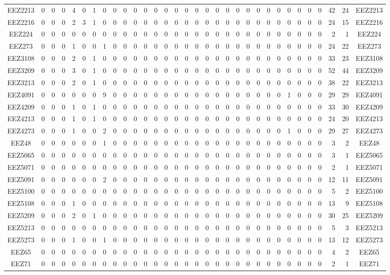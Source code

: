 \documentclass[10pt,a4paper,twoside]{report}
\begin{document}
{\begin{tabular}{crrrrrrrrrrrrrrrrrrrrrrrrrrrrrrc}
EEZ2213&0&0&0&4&0&1&0&0&0&0&0&0&0&0&0&0&0&0&0&0&0&0&0&0&0&0&0&0&42&24&EEZ2213\\
EEZ2216&0&0&0&2&3&1&0&0&0&0&0&0&0&0&0&0&0&0&0&0&0&0&0&0&0&0&0&0&24&15&EEZ2216\\
EEZ224&0&0&0&0&0&0&0&0&0&0&0&0&0&0&0&0&0&0&0&0&0&0&0&0&0&0&0&0&2&1&EEZ224\\
EEZ273&0&0&0&1&0&0&1&0&0&0&0&0&0&0&0&0&0&0&0&0&0&0&0&0&0&0&0&0&24&22&EEZ273\\
EEZ3108&0&0&0&2&0&1&0&0&0&0&0&0&0&0&0&0&0&0&0&0&0&0&0&0&0&0&0&0&33&23&EEZ3108\\
EEZ3209&0&0&0&3&0&1&0&0&0&0&0&0&0&0&0&0&0&0&0&0&0&0&0&0&0&0&0&0&52&44&EEZ3209\\
EEZ3213&0&0&0&2&0&1&0&0&0&0&0&0&0&0&0&0&0&0&0&0&0&0&0&0&0&0&0&0&38&22&EEZ3213\\
EEZ4091&0&0&0&0&0&0&9&0&0&0&0&0&0&0&0&0&0&0&0&0&0&0&0&0&1&0&0&0&29&29&EEZ4091\\
EEZ4209&0&0&0&1&0&1&0&0&0&0&0&0&0&0&0&0&0&0&0&0&0&0&0&0&0&0&0&0&33&30&EEZ4209\\
EEZ4213&0&0&0&1&0&1&0&0&0&0&0&0&0&0&0&0&0&0&0&0&0&0&0&0&0&0&0&0&24&20&EEZ4213\\
EEZ4273&0&0&0&1&0&0&2&0&0&0&0&0&0&0&0&0&0&0&0&0&0&0&0&0&1&0&0&0&29&27&EEZ4273\\
EEZ48&0&0&0&0&0&0&1&0&0&0&0&0&0&0&0&0&0&0&0&0&0&0&0&0&0&0&0&0&3&2&EEZ48\\
EEZ5065&0&0&0&0&0&0&0&0&0&0&0&0&0&0&0&0&0&0&0&0&0&0&0&0&0&0&0&0&3&1&EEZ5065\\
EEZ5071&0&0&0&0&0&0&0&0&0&0&0&0&0&0&0&0&0&0&0&0&0&0&0&0&0&0&0&0&2&1&EEZ5071\\
EEZ5091&0&0&0&0&0&0&2&0&0&0&0&0&0&0&0&0&0&0&0&0&0&0&0&0&0&0&0&0&12&11&EEZ5091\\
EEZ5100&0&0&0&0&0&0&0&0&0&0&0&0&0&0&0&0&0&0&0&0&0&0&0&0&0&0&0&0&5&2&EEZ5100\\
EEZ5108&0&0&0&1&0&0&0&0&0&0&0&0&0&0&0&0&0&0&0&0&0&0&0&0&0&0&0&0&13&9&EEZ5108\\
EEZ5209&0&0&0&2&0&1&0&0&0&0&0&0&0&0&0&0&0&0&0&0&0&0&0&0&0&0&0&0&30&25&EEZ5209\\
EEZ5213&0&0&0&0&0&0&0&0&0&0&0&0&0&0&0&0&0&0&0&0&0&0&0&0&0&0&0&0&5&3&EEZ5213\\
EEZ5273&0&0&0&1&0&0&1&0&0&0&0&0&0&0&0&0&0&0&0&0&0&0&0&0&0&0&0&0&13&12&EEZ5273\\
EEZ65&0&0&0&0&0&0&0&0&0&0&0&0&0&0&0&0&0&0&0&0&0&0&0&0&0&0&0&0&4&2&EEZ65\\
EEZ71&0&0&0&0&0&0&0&0&0&0&0&0&0&0&0&0&0&0&0&0&0&0&0&0&0&0&0&0&2&1&EEZ71\\

\end{tabular}}
\end{document}
